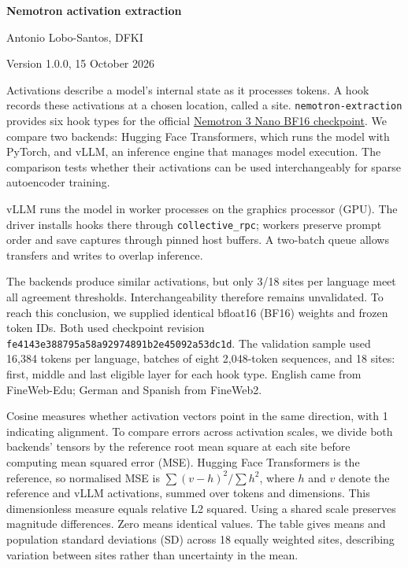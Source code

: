 \documentclass[10pt,a4paper]{article}
\begin{document}
\begin{center}
{\Large\bfseries Nemotron activation extraction}\par\vspace{3pt}
{\small Antonio Lobo-Santos, DFKI}\par
{\small Version 1.0.0, 15 October 2026}
\end{center}

Activations describe a model's internal state as it processes tokens.
A hook records these activations at a chosen location, called a site.
\texttt{nemotron-extraction} provides six hook types for the official
\href{https://huggingface.co/nvidia/NVIDIA-Nemotron-3-Nano-30B-A3B-BF16}{Nemotron 3 Nano BF16 checkpoint}.
We compare two backends: Hugging Face Transformers, which runs the model with
PyTorch, and vLLM, an inference engine that manages model execution.
The comparison tests whether their activations can be used interchangeably for
sparse autoencoder training.

vLLM runs the model in worker processes on the graphics processor (GPU).
The driver installs hooks there through \texttt{collective\_rpc}; workers
preserve prompt order and save captures through pinned host buffers.
A two-batch queue allows transfers and writes to overlap inference.

The backends produce similar activations, but only 3/18 sites per language meet
all agreement thresholds. Interchangeability therefore remains unvalidated.
To reach this conclusion, we supplied identical bfloat16 (BF16) weights and frozen token IDs.
Both used checkpoint revision \texttt{fe4143e388795a58a9297\allowbreak4891b2e45092a53dc1d}.
The validation sample used 16,384 tokens per language, batches of eight
2,048-token sequences, and 18 sites: first, middle and last eligible layer for
each hook type. English came from FineWeb-Edu; German and Spanish from FineWeb2.

Cosine measures whether activation vectors point in the same direction, with
1 indicating alignment. To compare errors across activation scales, we divide
both backends' tensors by the reference root mean square at each site before
computing mean squared error (MSE). Hugging Face Transformers is the reference,
so normalised MSE is
$\sum(v-h)^2/\sum h^2$, where $h$ and $v$ denote the reference and vLLM activations, summed over tokens and
dimensions. This dimensionless measure equals relative L2 squared. Using a
shared scale preserves magnitude differences. Zero means identical values.
The table gives means and population standard deviations (SD) across 18 equally weighted sites, describing
variation between sites rather than uncertainty in the mean.
\end{document}
